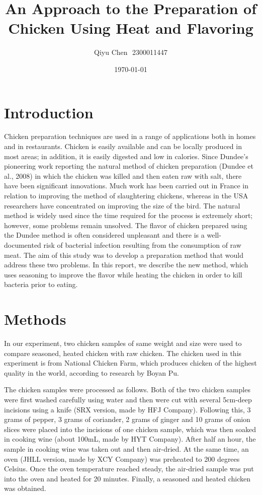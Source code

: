 \documentclass[a4paper,12pt]{article}
\author{Qiyu Chen\,\, 2300011447}
\title{An Approach to the Preparation of Chicken Using Heat and Flavoring}
\date{\today}
\begin{document}
	\maketitle
	\section{Introduction}
	Chicken preparation techniques are used in a range of applications both in homes and in restaurants. Chicken is easily available and can be locally produced in most areas; in addition, it is easily digested and low in calories.
	Since Dundee’s pioneering work reporting the natural method of chicken preparation (Dundee et al., 2008) in which the chicken was killed and then eaten raw with salt, there have been significant innovations. Much work has been carried out in France in relation to improving the method of slaughtering chickens, whereas in the USA researchers have concentrated on improving the size of the bird. The natural method is widely used since the time required for the process is extremely short; however, some problems remain unsolved. The flavor of chicken prepared using the Dundee method is often considered unpleasant and there is a well-documented risk of bacterial infection resulting from the consumption of raw meat.
	The aim of this study was to develop a preparation method that would address these two problems. In this report, we describe the new method, which uses seasoning to improve the flavor while heating the chicken in order to kill bacteria prior to eating. 
	\section{Methods}
	In our experiment, two chicken samples of same weight and size were used to compare seasoned, heated chicken with raw chicken. The chicken used in this experiment is from National Chicken Farm, which produces chicken of the highest quality in the world, according to research by Boyan Pu\cite{pby}. 
	
	The chicken samples were processed as follows. Both of the two chicken samples were first washed carefully using water and then were cut with several 5cm-deep incisions using a knife (SRX version, made by HFJ Company). Following this, 3 grams of pepper, 3 grams of coriander, 2 grams of ginger and 10 grams of onion slices were placed into the incisions of one chicken sample, which was then soaked in cooking wine (about 100mL, made by HYT Company). After half an hour, the sample in cooking wine was taken out and then air-dried. At the same time, an oven (JHLL version, made by XCY Company) was preheated to 200 degrees Celsius. Once the oven temperature reached steady, the air-dried sample was put into the oven and heated for 20 minutes. Finally, a seasoned and heated chicken was obtained.
	
\end{document}

